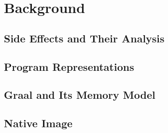 \chapter{Background}\label{chap:background}

\section{Side Effects and Their Analysis}\label{sec:bg-side-effects}

\section{Program Representations}\label{sec:bg-representations}

\section{Graal and Its Memory Model}\label{sec:bg-graal}

\section{Native Image}\label{sec:bg-native-image}
